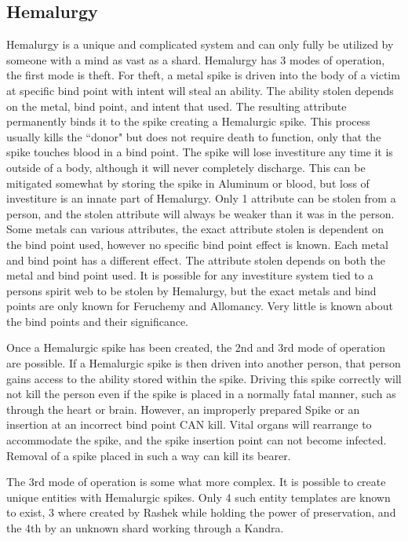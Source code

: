 \documentclass[conference]{IEEEtran}
\begin{document}
\subsection*{Hemalurgy}
Hemalurgy is a unique and complicated system and can only fully be utilized by someone with a mind as vast as a shard.  Hemalurgy has 3 modes of operation, the first mode is theft.  For theft, a metal spike is driven into the body of a victim at specific bind point with intent will steal an ability.  The ability stolen depends on the metal, bind point, and intent that used.  The resulting attribute permanently binds it to the spike creating a Hemalurgic spike.  This process usually kills the ``donor" but does not require death to function, only that the spike touches blood in a bind point.  The spike will lose investiture any time it is outside of a body, although it will never completely discharge.  This can be mitigated somewhat by storing the spike in Aluminum or blood, but loss of investiture is an innate part of Hemalurgy.  Only 1 attribute can be stolen from a person, and the stolen attribute will always be weaker than it was in the person.  Some metals can various attributes, the exact attribute stolen is dependent on the bind point used, however no specific bind point effect is known.
Each metal and bind point has a different effect.  The attribute stolen depends on both the metal and bind point used.  It is possible for any investiture system tied to a persons spirit web to be stolen by Hemalurgy, but the exact metals and bind points are only known for Feruchemy and Allomancy.  Very little is known about the bind points and their significance.

Once a Hemalurgic spike has been created, the 2nd and 3rd mode of operation are possible.  If a Hemalurgic spike is then driven into another person, that person gains access to the ability stored within the spike.  Driving this spike correctly will not kill the person even if the spike is placed in a normally fatal manner, such as through the heart or brain.  However, an improperly prepared Spike or an insertion at an incorrect bind point CAN kill.  Vital organs will rearrange to accommodate the spike, and the spike insertion point can not become infected.  Removal of a spike placed in such a way can kill its bearer.  

The 3rd mode of operation is some what more complex.  It is possible to create unique entities with Hemalurgic spikes.  Only 4 such entity templates are known to exist, 3 where created by Rashek while holding the power of preservation, and the 4th by an unknown shard working through a Kandra. 
\end{document}
